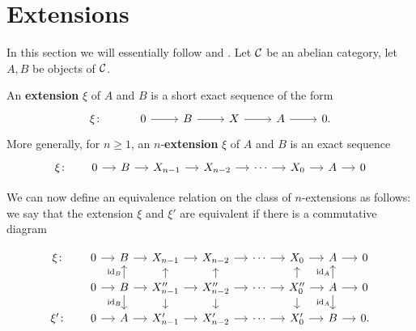 \section{Extensions}
\label{sec:extensions}
In this section we will essentially follow \cite{Weibel_1994} and \cite{maclane2012homology}.
Let $\mathcal{C}$ be an abelian category, let $A,B$ be objects of $\mathcal{C}$.

\begin{definition}[Extension]
	An \textbf{extension} $\xi$ of $A$ and $B$ is a short exact sequence of the form
	\[\begin{tikzcd}
		{\xi\colon} & 0 & B & X & A & {0.}
		\arrow[from=1-2, to=1-3]
		\arrow[from=1-3, to=1-4]
		\arrow[from=1-4, to=1-5]
		\arrow[from=1-5, to=1-6]
	\end{tikzcd}\]
	More generally, for $n\geq 1$, an $n$-\textbf{extension} $\xi$ of $A$ and $B$ is an exact sequence 
	\[\begin{tikzcd}[sep=small]
		{\xi \colon} & 0 & B & {X_{n-1}} & {X_{n-2}} & \cdots & {X_0} & A & 0
		\arrow[from=1-2, to=1-3]
		\arrow[from=1-3, to=1-4]
		\arrow[from=1-4, to=1-5]
		\arrow[from=1-5, to=1-6]
		\arrow[from=1-6, to=1-7]
		\arrow[from=1-7, to=1-8]
		\arrow[from=1-8, to=1-9]
	\end{tikzcd}\]
\end{definition}

We can now define an equivalence relation on the class of $n$-extensions as follows: we say that the extension $\xi$ and $\xi'$ are equivalent if there is a commutative diagram

\[\begin{tikzcd}[sep=small]
	{\xi \colon} & 0 & B & {X_{n-1}} & {X_{n-2}} & \cdots & {X_0} & A & 0 \\
	& 0 & B & {X''_{n-1}} & {X''_{n-2}} & \cdots & {X''_0} & A & {0} \\
	{\xi'\colon} & 0 & A & {X_{n-1}'} & {X_{n-2}'} & \cdots & {X'_0} & B & {0.}
	\arrow[from=1-2, to=1-3]
	\arrow[from=1-3, to=1-4]
	\arrow[from=1-4, to=1-5]
	\arrow[from=1-5, to=1-6]
	\arrow[from=1-6, to=1-7]
	\arrow[from=1-7, to=1-8]
	\arrow[from=1-8, to=1-9]
	\arrow[from=2-2, to=2-3]
	\arrow["{\id_B}", from=2-3, to=1-3]
	\arrow[from=2-3, to=2-4]
	\arrow["{\id_B}"', from=2-3, to=3-3]
	\arrow[from=2-4, to=1-4]
	\arrow[from=2-4, to=2-5]
	\arrow[from=2-4, to=3-4]
	\arrow[from=2-5, to=1-5]
	\arrow[from=2-5, to=2-6]
	\arrow[from=2-5, to=3-5]
	\arrow[from=2-6, to=2-7]
	\arrow[from=2-7, to=1-7]
	\arrow[from=2-7, to=2-8]
	\arrow[from=2-7, to=3-7]
	\arrow["{\id_A}", from=2-8, to=1-8]
	\arrow[from=2-8, to=2-9]
	\arrow["{\id_A}"', from=2-8, to=3-8]
	\arrow[from=3-2, to=3-3]
	\arrow[from=3-3, to=3-4]
	\arrow[from=3-4, to=3-5]
	\arrow[from=3-5, to=3-6]
	\arrow[from=3-6, to=3-7]
	\arrow[from=3-7, to=3-8]
	\arrow[from=3-8, to=3-9]
\end{tikzcd}\]


